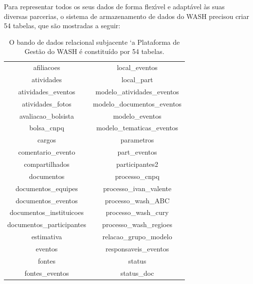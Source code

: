 \documentclass[
12pt,		%
openright,	%
twoside,  %
a4paper,			%
chapter=TITLE,		%
english,			%
french,				%
spanish,			%
brazil				%
]{USPSC-classe/USPSC_RedarTex}
\begin{document}
Para representar todos os seus dados de forma flex\'{\i}vel e adapt\'avel \`as suas diversas parcerias, o sistema de armazenamento de dados do WASH precisou criar 54 tabelas, que s\~ao mostradas a seguir:














\begin{table}[htb]
\tiny
\caption{\label{62820c43f4bf3d75d20214edbbec83c95ad1df81}O bando de dados relacional subjacente `a Plataforma de Gest\~ao do WASH \'e constitu\'{i}do por 54 tabelas.}

\centering
\begin{tabular}{|c|c|}
\hline
afiliacoes                     &   local\_eventos \\
 atividades                     &   local\_part \\
 atividades\_eventos             &   modelo\_atividades\_eventos \\
 atividades\_fotos               &   modelo\_documentos\_eventos \\
 avaliacao\_bolsista             &   modelo\_eventos \\
 bolsa\_cnpq                     &   modelo\_tematicas\_eventos \\
 cargos                         &   parametros \\
 comentario\_evento              &   part\_eventos \\
 compartilhados                 &   participantes2 \\
 documentos                     &   processo\_cnpq \\
 documentos\_equipes             &   processo\_ivan\_valente \\
 documentos\_eventos             &   processo\_wash\_ABC \\
 documentos\_instituicoes        &   processo\_wash\_cury \\
 documentos\_participantes       &   processo\_wash\_regioes \\
 estimativa                     &   relacao\_grupo\_modelo \\
 eventos                        &   responsaveis\_eventos \\
 fontes                         &   status \\
 fontes\_eventos                 &   status\_doc \\

\end{tabular}
\end{table}
\end{document}
